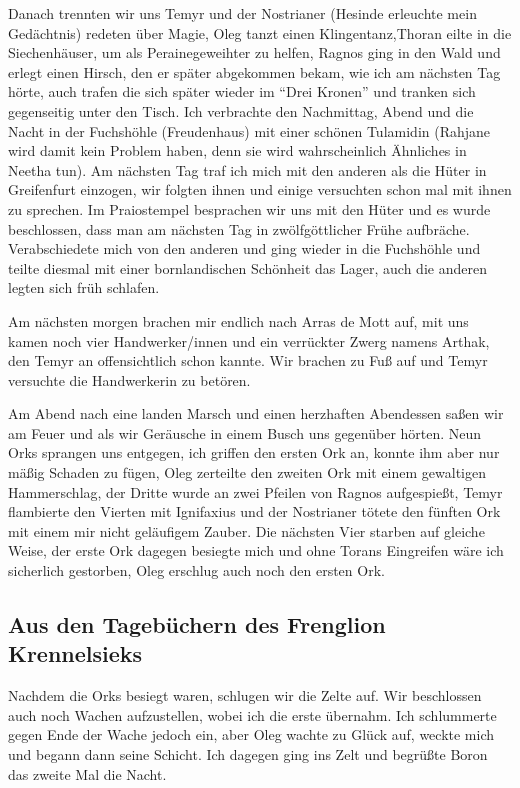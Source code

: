 Danach trennten wir uns Temyr und der Nostrianer (Hesinde erleuchte mein Gedächtnis) redeten über Magie, Oleg tanzt einen Klingentanz,Thoran eilte in die Siechenhäuser, um als Perainegeweihter zu helfen, Ragnos ging in den Wald und erlegt einen Hirsch, den er später abgekommen bekam, wie ich am nächsten Tag hörte, auch trafen die sich später wieder im ``Drei Kronen'' und tranken sich gegenseitig unter den Tisch. Ich verbrachte den Nachmittag, Abend und die Nacht in der Fuchshöhle (Freudenhaus) mit einer schönen Tulamidin (Rahjane wird damit kein Problem haben, denn sie wird wahrscheinlich Ähnliches in Neetha tun). Am nächsten Tag traf ich mich mit den anderen als die Hüter in Greifenfurt einzogen, wir folgten ihnen und einige versuchten schon mal mit ihnen zu sprechen. Im Praiostempel besprachen wir uns mit den Hüter und es wurde beschlossen, dass man am nächsten Tag in zwölfgöttlicher Frühe aufbräche. Verabschiedete mich von den anderen und ging wieder in die Fuchshöhle und teilte diesmal mit einer bornlandischen Schönheit das Lager, auch die anderen legten sich früh schlafen.

Am nächsten morgen brachen mir endlich nach Arras de Mott auf, mit uns kamen noch vier Handwerker/innen und ein verrückter Zwerg namens Arthak, den Temyr an offensichtlich schon kannte. Wir brachen zu Fuß auf und Temyr versuchte die Handwerkerin zu betören.

Am Abend nach eine landen Marsch und einen herzhaften Abendessen saßen wir am Feuer und als wir Geräusche in einem Busch uns gegenüber hörten. Neun Orks sprangen uns entgegen, ich griffen den ersten Ork an, konnte ihm aber nur mäßig Schaden zu fügen, Oleg zerteilte den zweiten Ork mit einem gewaltigen Hammerschlag, der Dritte wurde an zwei Pfeilen von Ragnos aufgespießt, Temyr flambierte den Vierten mit Ignifaxius und der Nostrianer tötete den fünften Ork mit einem mir nicht geläufigem Zauber. Die nächsten Vier starben auf gleiche Weise, der erste Ork dagegen besiegte mich und ohne Torans Eingreifen wäre ich sicherlich gestorben, Oleg erschlug auch noch den ersten Ork.


\subsection{Aus den Tagebüchern des Frenglion Krennelsieks}

Nachdem die Orks besiegt waren, schlugen wir die Zelte auf. Wir beschlossen auch noch Wachen aufzustellen, wobei ich die erste übernahm. Ich schlummerte gegen Ende der Wache jedoch ein, aber Oleg wachte zu Glück auf, weckte mich und begann dann seine Schicht. Ich dagegen ging ins Zelt und begrüßte Boron das zweite Mal die Nacht.

